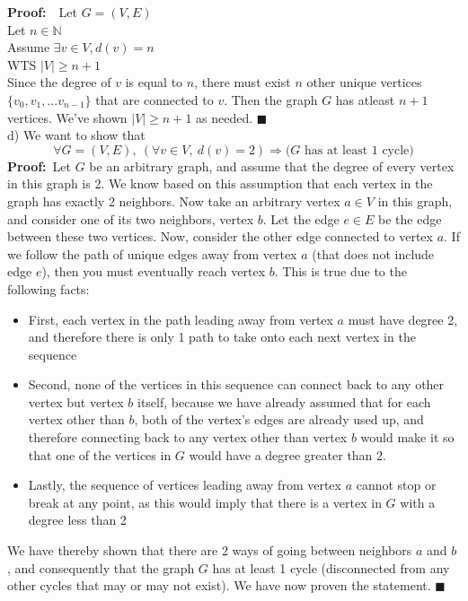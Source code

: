 \documentclass{article}
\newcommand{\N}{\mathbb{N}}
\begin{document}
\begin{enumerate}
	\textbf{Proof:}\ \ Let $ G = (V, E)$\\
	Let $n \in \N$ \\
	Assume $\exists v \in V, d(v) = n$\\
	WTS $|V| \geq n+1$ \\
	
	Since the degree of $v$ is equal to $n$, there must exist $n$ other unique vertices $\{v_0, v_1, ... v_{n-1}\}$ that are connected to $v$. Then the graph $G$ has atleast $n + 1$ vertices. We've shown $|V| \geq n+1$ as needed. \null\hfill $\blacksquare$\\ 
	
	d) We want to show that $$\forall G=(V,E),\ (\forall v \in V,\ d(v)=2) \Rightarrow (\textrm{$G$ has at least 1 cycle)}$$ 
	\textbf{Proof:}\ Let $G$ be an arbitrary graph, and assume that the degree of every vertex in this graph is 2. We know based on this assumption that each vertex in the graph has exactly 2 neighbors. Now take an arbitrary vertex $a \in V$ in this graph, and consider one of its two neighbors, vertex $b$. Let the edge $e \in E$ be the edge between these two vertices. Now, consider the other edge connected to vertex $a$. If we follow the path of unique edges away from vertex $a$ (that does not include edge $e$), then you must eventually reach vertex $b$. This is true due to the following facts:
	\begin{itemize}
		\item First, each vertex in the path leading away from vertex $a$ must have degree 2, and therefore there is only 1 path to take onto each next vertex in the sequence
		\item Second, none of the vertices in this sequence can connect back to any other vertex but vertex $b$ itself, because we have already assumed that for each vertex other than $b$, both of the vertex's edges are already used up, and therefore connecting back to any vertex other than vertex $b$ would make it so that one of the vertices in $G$ would have a degree greater than 2. 
		\item Lastly, the sequence of vertices leading away from vertex $a$ cannot stop or break at any point, as this would imply that there is a vertex in $G$ with a degree less than 2 
	\end{itemize} 

	We have thereby shown that there are 2 ways of going between neighbors $a$ and $b$, and consequently that the graph $G$ has at least 1 cycle (disconnected from any other cycles that may or may not exist). We have now proven the statement. \null\hfill $\blacksquare$\\
	

\end{enumerate}
\end{document}
